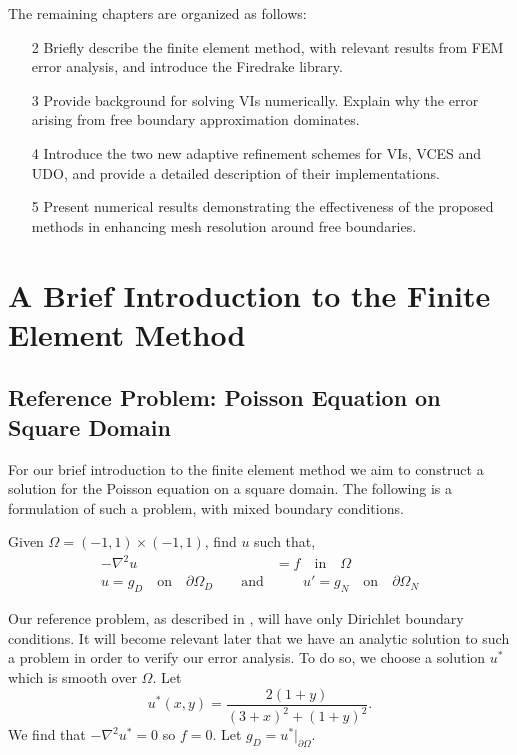 \documentclass[12 pt]{report}
\begin{document}
The remaining chapters are organized as follows:
\begin{enumerate}
  \item[2] Briefly describe the finite element method, with relevant results from FEM error analysis, and introduce the Firedrake library. 
  \item[3] Provide background for solving VIs numerically. Explain why the error arising from free boundary approximation dominates. 
  \item[4] Introduce the two new adaptive refinement schemes for VIs, VCES and UDO, and provide a detailed description of their implementations.
  \item[5] Present numerical results demonstrating the effectiveness of the proposed methods in enhancing mesh resolution around free boundaries. 
\end{enumerate}


\chapter{A Brief Introduction to the Finite Element Method}
\section{Reference Problem: Poisson Equation on Square Domain}
For our brief introduction to the finite element method we aim to construct a solution for the Poisson equation on a square domain. The following is a formulation of such a problem, with mixed boundary conditions.
\begin{mdframed}
    Given $\Omega = (-1, 1) \times (-1, 1)$, find $u$ such that, 
    \begin{align}  \label{eq:poisson}
      -\nabla^2u &= f \quad\text{in}\quad \Omega\\
       u = g_D \quad \text{on}\quad \partial \Omega_D \qquad \text{and} &\qquad u' = g_N \quad \text{on} \quad \partial\Omega_N
    \end{align}
\end{mdframed}

Our reference problem, as described in \citet{elman_finite_2005}, will have only Dirichlet boundary conditions. It will become relevant later that we have an analytic solution to such a problem in order to verify our error analysis. To do so, we choose a solution $u^*$ which is smooth over $\Omega$. Let
\begin{equation}
  u^*(x, y) = \dfrac{2(1 + y)}{(3 + x)^2 + (1 + y)^2}. 
\end{equation}
We find that $-\nabla^2u^* = 0$ so $f = 0$. Let $g_D = u^*|_{\partial\Omega}$.
\end{document}
